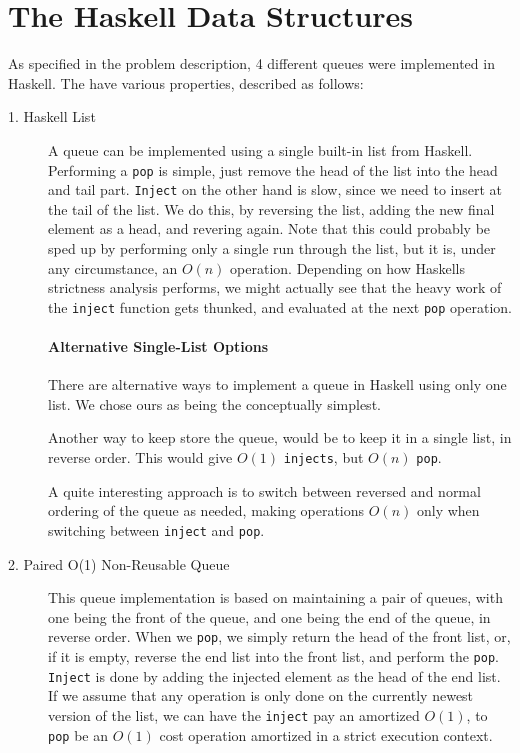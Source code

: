 \section{The Haskell Data Structures}

As specified in the problem description, 4 different queues were implemented in Haskell. The have various properties, described as follows:

\begin{description}
\item[1. Haskell List] 
A queue can be implemented using a single built-in list from Haskell. 
Performing a \texttt{pop} is simple, just remove the head of the list into the head and tail part.
\texttt{Inject} on the other hand is slow, since we need to insert at the tail of the list. We do this, by reversing the list, adding the new final element as a head, and revering again. Note that this could probably be sped up by performing only a single run through the list, but it is, under any circumstance, an $O(n)$ operation.
Depending on how Haskells strictness analysis performs, we might actually see that the heavy work of the \texttt{inject} function gets thunked, and evaluated at the next \texttt{pop} operation.

\paragraph{Alternative Single-List Options}

There are alternative ways to implement a queue in Haskell using only one list. We chose ours as being the conceptually simplest.

Another way to keep store the queue, would be to keep it in a single list, in reverse order. This would give $O(1)$ \texttt{injects}, but $O(n)$ \texttt{pop}.

A quite interesting approach is to switch between reversed and normal ordering of the queue as needed, making operations $O(n)$ only when switching between \texttt{inject} and \texttt{pop}. 

\item[2. Paired O(1) Non-Reusable Queue]
This queue implementation is based on maintaining a pair of queues, with one being the front of the queue, and one being the end of the queue, in reverse order. 
When we \texttt{pop}, we simply return the head of the front list, or, if it is empty, reverse the end list into the front list, and perform the \texttt{pop}.
\texttt{Inject} is done by adding the injected element as the head of the end list.
If we assume that any operation is only done on the currently newest version of the list, we can have the \texttt{inject} pay an amortized $O(1)$, to \texttt{pop} be an $O(1)$ cost operation amortized in a strict execution context.


\end{description}
